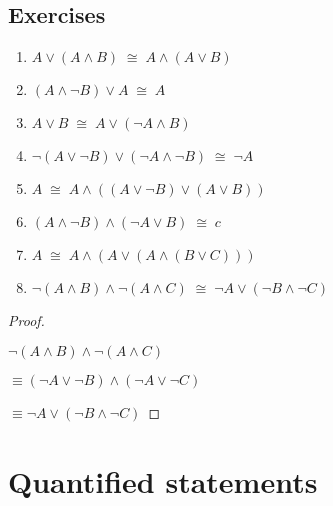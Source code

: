 \documentclass[10pt,]{book}
\theoremstyle{plain}
\theoremstyle{definition}
\theoremstyle{definition}
\numberwithin{equation}{section}
\begin{document}
\subsection[{Exercises}]{Exercises}\label{exercises-11}
\leavevmode%
\begin{enumerate}[label=(\alph*)]
\item\hypertarget{li-166}{}
          \(A \lor (A \land B) \; \cong \; A \land (A \lor B)\)
\item\hypertarget{li-167}{}
          \((A \land {\lnot}B) \lor A \; \cong \; A\)
\item\hypertarget{li-168}{}
          \(A \lor B \; \cong \; A \lor ({\lnot}A \land B)\)
\item\hypertarget{li-169}{}
          \({\lnot}(A \lor {\lnot}B) \lor ({\lnot}A \land {\lnot}B) \; \cong \; {\lnot}A\)
\item\hypertarget{li-170}{}
          \(A \; \cong \; A \land ((A \lor {\lnot}B) \lor (A \lor B))\)
\item\hypertarget{li-171}{}
          \((A \land {\lnot}B) \land ({\lnot}A \lor B) \; \cong \; c\)
\item\hypertarget{li-172}{}
          \(A \; \cong \; A \land (A \lor (A \land (B \lor C)))\)
\item\hypertarget{li-173}{}
          \({\lnot}(A \land B) \land {\lnot}(A \land C) \; \cong \; {\lnot}A \lor ({\lnot}B \land {\lnot}C)\)
\end{enumerate}
\begin{proof}\hypertarget{proof-5}{}

        \({\lnot}(A \land B) \land {\lnot}(A \land C)\)
\par

\par

        \(\equiv     ({\lnot}A \lor {\lnot}B) \land ({\lnot}A \lor {\lnot}C)\)
\par

\par

        \(\equiv    {\lnot}A \lor ({\lnot}B \land {\lnot}C)\)
\end{proof}
\typeout{************************************************}
\typeout{************************************************}
\section[{Quantified statements}]{Quantified statements}\label{sec_quant}
\end{document}
